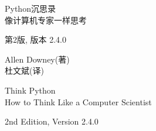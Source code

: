 \documentclass[10pt]{book}
\newcommand{\theversion}{2nd Edition, Version 2.4.0}
\newcommand{\thedate}{}
\begin{document}
\begin{latexonly}

\renewcommand{\blankpage}{\thispagestyle{empty} \quad \newpage}



\thispagestyle{empty}

\begin{flushright}
\vspace*{2.0in}

\begin{spacing}{3}
{\huge Python沉思录}\\
{\Large 像计算机专家一样思考}
\end{spacing}

\vspace{0.25in}

{\small 第2版, 版本 2.4.0}

\thedate
\vspace{1in}

{\Large
	Allen Downey(著)\\
}
{\small 杜文斌(译)}
\vspace{0.5in}

\vfill

\end{flushright}


\blankpage
\blankpage

\pagebreak
\thispagestyle{empty}

\begin{flushright}
\vspace*{2.0in}

\begin{spacing}{3}
{\huge Think Python}\\
{\Large How to Think Like a Computer Scientist}
\end{spacing}

\vspace{0.25in}

\theversion

\thedate

\vspace{1in}



\end{flushright}
\end{latexonly}
\end{document}
